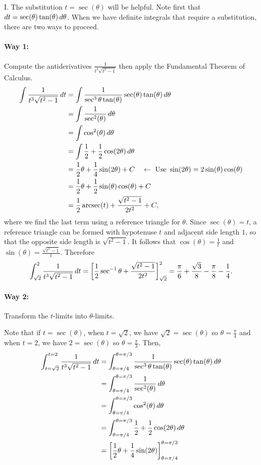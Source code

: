 \documentclass[noauthor]{ximera}
\begin{document}
\begin{freeResponse}
I. The substitution $t = \sec(\theta)$ will be helpful.  Note first that $\mathop{}\!d t = \sec(\theta) \tan(\theta) \mathop{}\!d \theta$.  When we have definite integrals that require a substitution, there are two ways to proceed.

\paragraph{Way 1:} Compute the antiderivatives $\frac{1}{t^3 \sqrt{t^2 -1}}$ then apply the Fundamental Theorem of Calculus.
\begin{align*}
\int \frac{1}{t^3\sqrt{t^2-1}} \mathop{}\!d t &= \int \frac{1}{\sec^3 \theta \tan(\theta)} \sec(\theta) \tan(\theta) \mathop{}\!d \theta \\
&= \int \frac{1}{\sec^2(\theta)} \mathop{}\!d \theta \\
&= \int \cos^2(\theta) \mathop{}\!d \theta \\
&= \int \frac{1}{2} + \frac{1}{2} \cos (2 \theta) \mathop{}\!d \theta \\
&= \frac{1}{2}\theta + \frac{1}{4} \sin (2\theta) + C \quad \leftarrow \textrm{ Use } \sin(2\theta) = 2 \sin(\theta) \cos(\theta) \\
&= \frac{1}{2} \theta+\frac{1}{2}\sin(\theta) \cos(\theta) + C \\
&= \frac{1}{2} \operatorname{arcsec}(t) + \frac{\sqrt{t^2-1}}{2t^2} + C,
\end{align*}
where we find the last term using a reference triangle for $\theta$. Since $\sec(\theta) = t$, a reference triangle can be formed with hypotenuse $t$ and adjacent side length $1$, so that the opposite side length is $\sqrt{t^2-1}$. It follows that $\cos(\theta) = \frac{1}{t}$ and $\sin(\theta) = \frac{\sqrt{t^2-1}}{t}$. Therefore
\[
\int_{\sqrt{2}}^2 \frac{1}{t^3 \sqrt{t^2 -1}} \mathop{}\!d t = \bigg[ \frac{1}{2} \sec^{-1}\theta + \frac{\sqrt{t^2-1}}{2t^2} \bigg]_{\sqrt{2}}^2 = \frac{\pi}{6} + \frac{\sqrt{3}}{8} -  \frac{\pi}{8} - \frac{1}{4}.
\]

\paragraph{Way 2:} Transform the $t$-limits into $\theta$-limits.

Note that if $t = \sec(\theta)$, when $t=\sqrt{2}$, we have $\sqrt{2} = \sec(\theta)$ so $\theta = \frac{\pi}{4}$ and when $t=2$, we have $2 = \sec(\theta)$ so $\theta=\frac{\pi}{3}$. Then,
\begin{align*}
\int_{t=\sqrt{2}}^{t=2} \frac{1}{t^3\sqrt{t^2-1}} \mathop{}\!d t &= \int_{\theta=\pi/4}^{\theta= \pi/3}\frac{1}{\sec^3 \theta \tan(\theta)} \sec(\theta) \tan(\theta) \mathop{}\!d \theta \\
&= \int_{\theta=\pi/4}^{\theta= \pi/3} \frac{1}{\sec^2(\theta)} \mathop{}\!d \theta \\
&= \int_{\theta=\pi/4}^{\theta= \pi/3} \cos^2(\theta) \mathop{}\!d \theta \\
&= \int_{\theta=\pi/4}^{\theta= \pi/3} \frac{1}{2} + \frac{1}{2} \cos (2 \theta) \mathop{}\!d \theta \\
&= \bigg[ \frac{1}{2}\theta + \frac{1}{4} \sin (2\theta) \bigg]_{\theta=\pi/4}^{\theta= \pi/3} \\
\end{align*}


\end{freeResponse}
\end{document}
